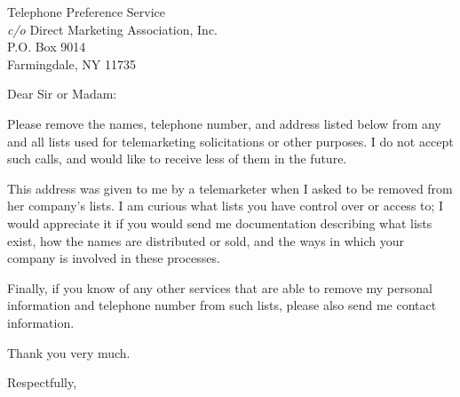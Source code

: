 \documentclass[10pt]{letter}
\date{\today}
\begin{document}
\begin{letter}{
               Telephone Preference Service \\
               {\it c/o} Direct Marketing Association, Inc. \\
               P.O. Box 9014 \\
               Farmingdale, NY  11735
               }   
                           
\opening{Dear Sir or Madam:}

Please remove the names, telephone number, and address listed below from 
any and all lists used for telemarketing solicitations or other purposes.  
I do not accept such calls, and would like to receive less of them in 
the future.

This address was given to me by a telemarketer when I asked to be removed 
from her company's lists.  I am curious what lists you have control over 
or access to; I would appreciate it if you would send me documentation 
describing what lists exist, how the names are distributed or sold, and 
the ways in which your company is involved in these processes.  

Finally, if you know 
of any other services that are able to remove my personal information and 
telephone number from such lists, please also send me contact information.

Thank you very much.

\closing{Respectfully,}

\end{letter}
\end{document}
